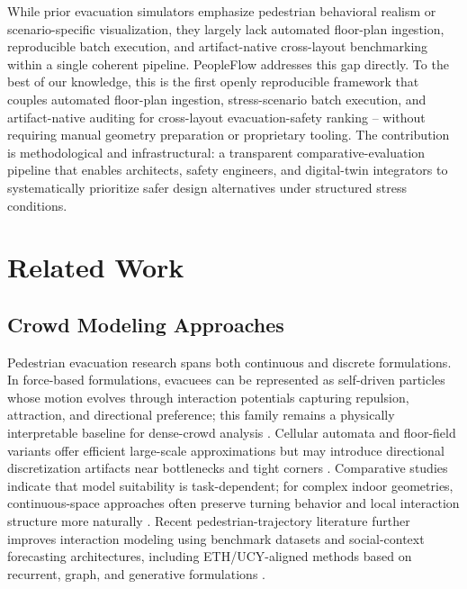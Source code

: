 \documentclass[utf8]{FrontiersinHarvard}
\begin{document}
While prior evacuation simulators emphasize pedestrian behavioral realism or scenario-specific visualization, they largely lack automated floor-plan ingestion, reproducible batch execution, and artifact-native cross-layout benchmarking within a single coherent pipeline. PeopleFlow addresses this gap directly. To the best of our knowledge, this is the first openly reproducible framework that couples automated floor-plan ingestion, stress-scenario batch execution, and artifact-native auditing for cross-layout evacuation-safety ranking -- without requiring manual geometry preparation or proprietary tooling. The contribution is methodological and infrastructural: a transparent comparative-evaluation pipeline that enables architects, safety engineers, and digital-twin integrators to systematically prioritize safer design alternatives under structured stress conditions.

\section{Related Work}
\subsection{Crowd Modeling Approaches}
Pedestrian evacuation research spans both continuous and discrete formulations. In force-based formulations, evacuees can be represented as self-driven particles whose motion evolves through interaction potentials capturing repulsion, attraction, and directional preference; this family remains a physically interpretable baseline for dense-crowd analysis \cite{sfm,helbing2000}. Cellular automata and floor-field variants offer efficient large-scale approximations but may introduce directional discretization artifacts near bottlenecks and tight corners \cite{ca,kirchner2002}. Comparative studies indicate that model suitability is task-dependent; for complex indoor geometries, continuous-space approaches often preserve turning behavior and local interaction structure more naturally \cite{zheng2009,duives2013,crowd_book}.
Recent pedestrian-trajectory literature further improves interaction modeling using benchmark datasets and social-context forecasting architectures, including ETH/UCY-aligned methods based on recurrent, graph, and generative formulations \cite{pellegrini2009eth,alahi2016sociallstm,gupta2018socialgan,salzmann2020trajectron,mohamed2020stgcnn,zhou2021astgnn,chen2021intention,li2020recurrent,wang2023timtraj,saleh2022transformer}.
\end{document}
